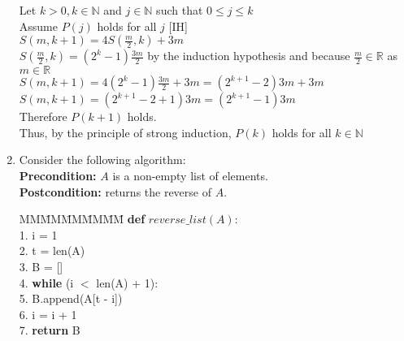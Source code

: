 \documentclass{article}
\begin{document}
\begin{enumerate}
Let $k > 0, k \in\mathbb{N}$ and $j \in\mathbb{N}$ such that $0\le j \le k$\\
Assume $P(j)$ holds for all $j$ [IH]\\
$S(m, k + 1) = 4S(\frac{m}{2}, k) + 3m $\\
$S(\frac{m}{2}, k) = ({2}^{k} - 1)\frac{3m}{2}$ by the induction hypothesis and because $\frac{m}{2} \in\mathbb{R}$ as $m \in\mathbb{R}$\\
$S(m, k + 1) =  4({2}^{k} - 1)\frac{3m}{2} + 3m = ({2}^{k+1} - 2)3m + 3m$\\
$S(m, k + 1) = ({2}^{k+1} - 2 + 1)3m = ({2}^{k+1} - 1)3m$\\
Therefore $P(k+1)$ holds.\\
Thus, by the principle of strong induction, $P(k)$ holds for all $k \in\mathbb{N}$

\item Consider the following algorithm:\\

\textbf{Precondition:} $A$ is a non-empty list of elements.\\
\textbf{Postcondition:} returns the reverse of $A$.\\
\begin{tabbing}
	MM\=MM\=MM\=MM\=MM\=\kill
	\>\textbf{def} $reverse\_list(A)$:\\
	1.\>  \> i = 1  \\ 
	2.\>  \> t = len(A)\\ 
	3.\>  \> B = [\:]  \\
	4.\>  \> \textbf{while} (i $<$ len(A) + 1):\\       
	5.\>  \> \> B.append(A[t - i])\\       
	6.\>  \> \> i = i + 1\\
	7.\>  \> \textbf{return} B
\end{tabbing}


\end{enumerate}
\end{document}
